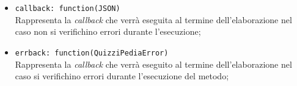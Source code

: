 \begin{itemize}
\begin{itemize}
\begin{itemize}
						\item \texttt{callback: function(JSON)} \\
						Rappresenta la \textit{callback} che verrà eseguita al termine dell'elaborazione nel caso non si verifichino errori durante l'esecuzione;
						\item \texttt{errback: function(QuizziPediaError)} \\
						Rappresenta la \textit{callback} che verrà eseguito al termine dell'elaborazione nel caso si verifichino errori durante l'esecuzione del metodo;
					\end{itemize}
			\end{itemize}
	\end{itemize}
	